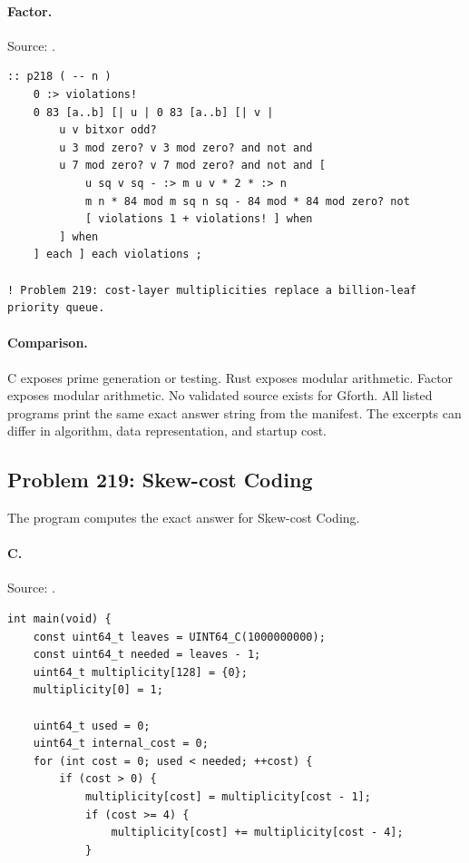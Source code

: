 \paragraph{Factor.} Source: .
\begin{lstlisting}
:: p218 ( -- n )
    0 :> violations!
    0 83 [a..b] [| u | 0 83 [a..b] [| v |
        u v bitxor odd?
        u 3 mod zero? v 3 mod zero? and not and
        u 7 mod zero? v 7 mod zero? and not and [
            u sq v sq - :> m u v * 2 * :> n
            m n * 84 mod m sq n sq - 84 mod * 84 mod zero? not
            [ violations 1 + violations! ] when
        ] when
    ] each ] each violations ;

! Problem 219: cost-layer multiplicities replace a billion-leaf priority queue.
\end{lstlisting}

\paragraph{Comparison.}
C exposes prime generation or testing. Rust exposes modular arithmetic. Factor exposes modular arithmetic.
No validated source exists for Gforth.
All listed programs print the same exact answer string from the manifest. The excerpts can differ in algorithm, data representation, and startup cost.

\subsection{Problem 219: Skew-cost Coding}
\label{walkthrough:p219}
The program computes the exact answer for Skew-cost Coding.

\paragraph{C.} Source: .
\begin{lstlisting}
int main(void) {
    const uint64_t leaves = UINT64_C(1000000000);
    const uint64_t needed = leaves - 1;
    uint64_t multiplicity[128] = {0};
    multiplicity[0] = 1;

    uint64_t used = 0;
    uint64_t internal_cost = 0;
    for (int cost = 0; used < needed; ++cost) {
        if (cost > 0) {
            multiplicity[cost] = multiplicity[cost - 1];
            if (cost >= 4) {
                multiplicity[cost] += multiplicity[cost - 4];
            }
\end{lstlisting}

